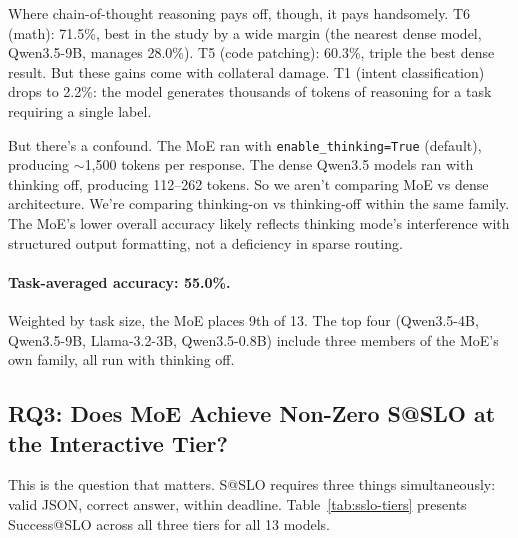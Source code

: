 \documentclass[11pt]{article}
\begin{document}
Where chain-of-thought reasoning pays off, though, it pays handsomely.  T6 (math): 71.5\%, best in the study by a wide margin (the nearest dense model, Qwen3.5-9B, manages 28.0\%).  T5 (code patching): 60.3\%, triple the best dense result.  But these gains come with collateral damage.  T1 (intent classification) drops to 2.2\%: the model generates thousands of tokens of reasoning for a task requiring a single label.

But there's a confound.  The MoE ran with \texttt{enable\_thinking=True} (default), producing ${\sim}$1,500 tokens per response.  The dense Qwen3.5 models ran with thinking off, producing 112--262 tokens.  So we aren't comparing MoE vs dense architecture.  We're comparing thinking-on vs thinking-off within the same family.  The MoE's lower overall accuracy likely reflects thinking mode's interference with structured output formatting, not a deficiency in sparse routing.

\paragraph{Task-averaged accuracy: 55.0\%.}
Weighted by task size, the MoE places 9th of 13.  The top four (Qwen3.5-4B, Qwen3.5-9B, Llama-3.2-3B, Qwen3.5-0.8B) include three members of the MoE's own family, all run with thinking off.

\subsection{RQ3: Does MoE Achieve Non-Zero S@SLO at the Interactive Tier?}
\label{sec:rq3-sslo}

This is the question that matters.  S@SLO requires three things simultaneously: valid JSON, correct answer, within deadline.  Table~\ref{tab:sslo-tiers} presents Success@SLO across all three tiers for all 13 models.
\end{document}
